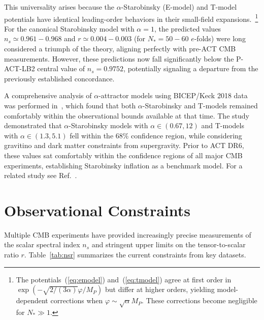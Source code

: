 \documentclass[aps,prev,twocolumn,preprintnumbers,floatfix,nofootinbib]{revtex4-1}
\begin{document}
This universality arises because the $\alpha$-Starobinsky (E-model) and T-model potentials have identical leading-order behaviors in their small-field expansions.~\footnote{The potentials~(\ref{eq:emodel}) and~(\ref{eq:tmodel}) agree at first order in $\exp(-\sqrt{2/(3\alpha)}\varphi/M_P)$ but differ at higher orders, yielding model-dependent corrections when $\varphi \sim \sqrt{\alpha}M_P$. These corrections become negligible for $N_* \gg 1$.} For the canonical Starobinsky model with $\alpha = 1$, the predicted values $n_s \simeq 0.961 - 0.968$ and $r \simeq 0.004 - 0.003$ (for $N_* = 50 - 60$ $e$-folds) were long considered a triumph of the theory, aligning perfectly with pre-ACT CMB measurements. However, these predictions now fall significantly below the P-ACT-LB2 central value of $n_s = 0.9752$, potentially signaling a departure from the previously established concordance.

A comprehensive analysis of $\alpha$-attractor models  using BICEP/Keck 2018 data was performed in~\cite{Ellis:2021kad}, which found that both $\alpha$-Starobinsky and T-models remained comfortably within the observational bounds available at that time. The study demonstrated that $\alpha$-Starobinsky models with $\alpha \in (0.67, 12)$ and T-models with $\alpha \in (1.3, 5.1)$ fell within the 68\% confidence region, while considering gravitino and dark matter constraints from supergravity. Prior to ACT DR6, these values sat comfortably within the confidence regions of all major CMB experiments, establishing Starobinsky inflation as a benchmark model.
For a related study see Ref.~\cite{Iacconi:2023mnw}.

\section{Observational Constraints}
\label{sec:obs}
Multiple CMB experiments have provided increasingly precise measurements of the scalar spectral index $n_s$ and stringent upper limits on the tensor-to-scalar ratio $r$. Table~\ref{tab:nsr} summarizes the current constraints from key datasets.
\end{document}
